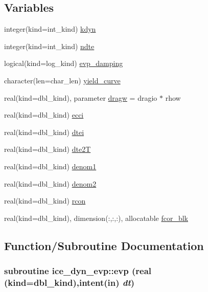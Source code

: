 \subsection*{Variables}
\begin{DoxyCompactItemize}
\item 
integer(kind=int\_\-kind) \hyperlink{namespaceice__dyn__evp_a53c5f7c9741c708ff3519f05aed59469}{kdyn}
\item 
integer(kind=int\_\-kind) \hyperlink{namespaceice__dyn__evp_a8eac575311a1794f1e0157b0f91c48e0}{ndte}
\item 
logical(kind=log\_\-kind) \hyperlink{namespaceice__dyn__evp_a79e497f85715426c0f09259d8fe336ed}{evp\_\-damping}
\item 
character(len=char\_\-len) \hyperlink{namespaceice__dyn__evp_a9dd00f965aaf1ddc6bd6921083e9abb1}{yield\_\-curve}
\item 
real(kind=dbl\_\-kind), parameter \hyperlink{namespaceice__dyn__evp_af77fabaa9bdeaa579c4f55bf5d6b2628}{dragw} = dragio $\ast$ rhow
\item 
real(kind=dbl\_\-kind) \hyperlink{namespaceice__dyn__evp_a74e9b0358ea08911b4d29dec60340f51}{ecci}
\item 
real(kind=dbl\_\-kind) \hyperlink{namespaceice__dyn__evp_a17c3a9aa810fbb29c6eda85ab2fb24dd}{dtei}
\item 
real(kind=dbl\_\-kind) \hyperlink{namespaceice__dyn__evp_a48f316b1e91781f36049db60d9d57d82}{dte2T}
\item 
real(kind=dbl\_\-kind) \hyperlink{namespaceice__dyn__evp_a485b3d193095e8d99aca4d1fc974ff56}{denom1}
\item 
real(kind=dbl\_\-kind) \hyperlink{namespaceice__dyn__evp_a7277e6c34976f4ccf320ab21b4d4f65f}{denom2}
\item 
real(kind=dbl\_\-kind) \hyperlink{namespaceice__dyn__evp_aa1005dc0bcfae1c38b0932bacec32121}{rcon}
\item 
real(kind=dbl\_\-kind), dimension(:,:,:), allocatable \hyperlink{namespaceice__dyn__evp_a1eeebacd4068f5555d3f66448b8acc64}{fcor\_\-blk}
\end{DoxyCompactItemize}


\subsection{Function/Subroutine Documentation}
\hypertarget{namespaceice__dyn__evp_a918e64924a8bc6d83610141982c8f5dd}{
\subsubsection[{evp}]{\setlength{\rightskip}{0pt plus 5cm}subroutine ice\_\-dyn\_\-evp::evp (real (kind=dbl\_\-kind),intent(in) {\em dt})}}
\label{namespaceice__dyn__evp_a918e64924a8bc6d83610141982c8f5dd}


